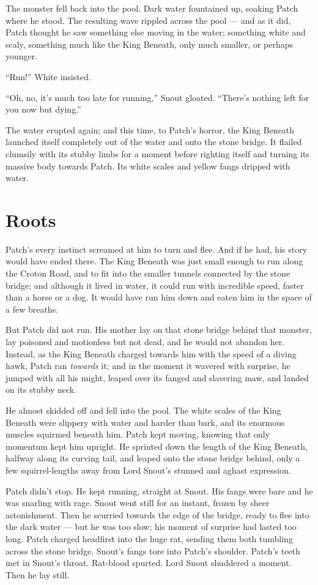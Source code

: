 \documentclass[ebook,oneside,openany,12pt]{memoir}
\begin{document}
The monster fell back into the pool. Dark water fountained up, soaking
Patch where he stood. The resulting wave rippled across the pool — and
as it did, Patch thought he saw something else moving in the water;
something white and scaly, something much like the King Beneath, only
much smaller, or perhaps younger.

“Run!” White insisted.

“Oh, no, it’s much too late for running,” Snout gloated. “There’s
nothing left for you now but dying.”

The water erupted again; and this time, to Patch’s horror, the King
Beneath launched itself completely out of the water and onto the stone
bridge. It flailed clumsily with its stubby limbs for a moment before
righting itself and turning its massive body towards Patch. Its white
scales and yellow fangs dripped with water.


\section{Roots}

Patch’s every instinct screamed at him to turn and flee. And if he
had, his story would have ended there. The King Beneath was just small
enough to run along the Croton Road, and to fit into the smaller
tunnels connected by the stone bridge; and although it lived in water,
it could run with incredible speed, faster than a horse or a dog. It
would have run him down and eaten him in the space of a few breaths.

But Patch did not run. His mother lay on that stone bridge behind that
monster, lay poisoned and motionless but not dead, and he would not
abandon her. Instead, as the King Beneath charged towards him with the
speed of a diving hawk, Patch ran \emph{towards} it; and in the
moment it wavered with surprise, he jumped with all his might, leaped
over its fanged and slavering maw, and landed on its stubby neck.

He almost skidded off and fell into the pool. The white scales of the
King Beneath were slippery with water and harder than bark, and its
enormous muscles squirmed beneath him. Patch kept moving, knowing that
only momentum kept him upright. He sprinted down the length of the
King Beneath, halfway along its curving tail, and leaped onto the
stone bridge behind, only a few squirrel-lengths away from Lord
Snout’s stunned and aghast expression.

Patch didn’t stop. He kept running, straight at Snout. His fangs were
bare and he was snarling with rage. Snout went still for an instant,
frozen by sheer astonishment. Then he scurried towards the edge of the
bridge, ready to flee into the dark water — but he was too slow; his
moment of surprise had lasted too long. Patch charged headfirst into
the huge rat, sending them both tumbling across the stone
bridge. Snout’s fangs tore into Patch’s shoulder. Patch’s teeth met in
Snout’s throat. Rat-blood spurted. Lord Snout shuddered a moment. Then
he lay still.
\end{document}
